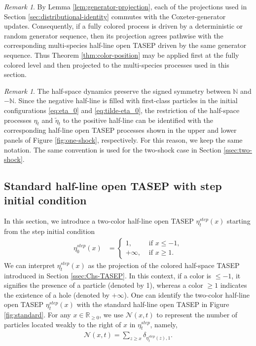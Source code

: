 \documentclass[12pt,a4paper]{amsart}
\theoremstyle{remark}
\newtheorem{remark}[theorem]{Remark}
\numberwithin{equation}{section} \numberwithin{theorem}{section}
\begin{document}
\begin{remark}
\label{rem:projection-sorting}
By Lemma \ref{lem:generator-projection}, each of the projections used in Section \ref{sec:distributional-identity} commutes with the Coxeter-generator updates. 
Consequently, if a fully colored process is driven by a deterministic or random generator sequence, then its projection agrees pathwise with the corresponding multi-species half-line open TASEP driven by the same generator sequence. 
Thus Theorem \ref{thm:color-position} may be applied first at the fully colored level and then projected to the multi-species processes used in this section.
\end{remark}

\begin{remark}
\label{rmk:model-equi}
The half-space dynamics preserve the signed symmetry between $\mathbb N$ and $-\mathbb N$. 
Since the negative half-line is filled with first-class particles in the initial configurations \eqref{eq:eta_0} and \eqref{eq:tilde-eta_0}, the restriction of the half-space processes $\eta_t$ and $\tilde{\eta}_t$ to the positive half-line can be identified with the corresponding half-line open TASEP processes shown in the upper and lower panels of Figure \ref{fig:one-shock}, respectively. 
For this reason, we keep the same notation. 
The same convention is used for the two-shock case in Section \ref{ssec:two-shock}.
\end{remark}


\subsection{Standard half-line open TASEP with step initial condition}
\label{ssec:HL-TASEP}

In this section, we introduce a two-color half-line open TASEP $\eta_{t}^{step}(x)$ starting from the step initial condition
\begin{align}
 \label{eq:eta-step}
\eta_{0}^{step}(x)&=
\begin{cases}
1, & \text{ if } x \leq -1, \\
+\infty, & \text{ if } x \geq 1.
\end{cases}
\end{align}
We can interpret $\eta_{t}^{step}(x)$ as the projection of the colored half-space TASEP introduced in Section \ref{ssec:Chs-TASEP}. In this context, if a color is $\leq -1$, it signifies the presence of a particle (denoted by 1), whereas a color $\geq 1$ indicates the existence of a hole (denoted by $+\infty$). One can identify the two-color half-line open TASEP $\eta_{t}^{step}(x)$ with the standard half-line open TASEP in Figure \ref{fig:standard}. For any $x \in \mathbb{R}_{\geq 0}$, we use $\mathcal{N}(x,t)$ to represent the number of particles located weakly to the right of $x$ in $\eta_{t}^{step}$, namely,
\begin{align}
\mathcal{N}(x,t)=\sum_{z \geq x} \delta_{\eta_t^{step}(z), 1}.
\end{align}
\end{document}
